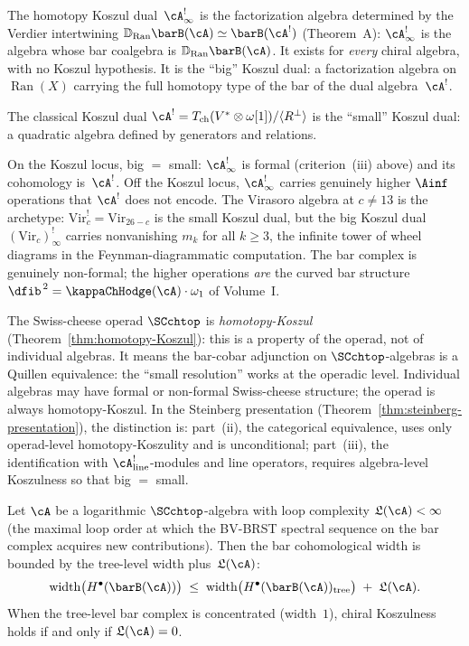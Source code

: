 \begin{remark}
\label{rem:big-vs-small}
The homotopy Koszul dual~$\cA^!_\infty$ is the factorization algebra
determined by the Verdier intertwining
$\mathbb{D}_{\operatorname{Ran}}\barB(\cA) \simeq \barB(\cA^!)$
(Theorem~A): $\cA^!_\infty$ is the algebra whose bar coalgebra is
$\mathbb{D}_{\operatorname{Ran}}\barB(\cA)$.
It exists for \emph{every} chiral algebra, with no Koszul
hypothesis. It is the ``big'' Koszul dual: a factorization algebra on
$\operatorname{Ran}(X)$ carrying the full homotopy type of the bar of
the dual algebra~$\cA^!$.

The classical Koszul dual $\cA^! = T_{\mathrm{ch}}(V^* \otimes
\omega[1])/\langle R^\perp\rangle$ is the ``small'' Koszul dual: a
quadratic algebra defined by generators and relations.

On the Koszul locus, big $=$ small: $\cA^!_\infty$ is formal
(criterion~(iii) above) and its cohomology is~$\cA^!$. Off the
Koszul locus, $\cA^!_\infty$ carries genuinely higher $\Ainf$
operations that $\cA^!$ does not encode. The Virasoro algebra at
$c \neq 13$ is the archetype: $\mathrm{Vir}_c^! = \mathrm{Vir}_{26-c}$
is the small Koszul dual, but the big Koszul dual
$(\mathrm{Vir}_c)^!_\infty$ carries nonvanishing $m_k$ for all
$k \geq 3$, the infinite tower of wheel diagrams in the
Feynman-diagrammatic computation. The bar complex is genuinely
non-formal; the higher operations \emph{are} the curved bar
structure $\dfib^{\,2} = \kappaChHodge(\cA) \cdot \omega_1$ of Volume~I.

The Swiss-cheese operad $\SCchtop$ is \emph{homotopy-Koszul}
(Theorem~\ref{thm:homotopy-Koszul}): this is a property of the
operad, not of individual algebras. It means the bar-cobar
adjunction on $\SCchtop$-algebras is a Quillen equivalence: the
``small resolution'' works at the operadic level. Individual algebras may have formal or non-formal Swiss-cheese
structure; the operad is always homotopy-Koszul.
In the Steinberg presentation
(Theorem~\ref{thm:steinberg-presentation}), the distinction is:
part~(ii), the categorical equivalence, uses only operad-level
homotopy-Koszulity and is unconditional; part~(iii), the
identification with $\cA^!_{\mathrm{line}}$-modules and line operators, requires
algebra-level Koszulness so that big $=$ small.
\end{remark}

\begin{theorem}
\label{thm:width-bound}
Let\/ $\cA$ be a logarithmic $\SCchtop$-algebra with loop
complexity\/ $\mathfrak{L}(\cA) < \infty$
\textup{(}the maximal loop order at which the BV-BRST
spectral sequence on the bar complex acquires new
contributions\textup{)}.
Then the bar cohomological width is bounded by the tree-level
width plus\/~$\mathfrak{L}(\cA)$:
\[
\mathrm{width}\bigl(H^\bullet(\barB(\cA))\bigr)
\;\le\;
\mathrm{width}\bigl(H^\bullet(\barB(\cA))_{\mathrm{tree}}\bigr)
\;+\; \mathfrak{L}(\cA).
\]
When the tree-level bar complex is concentrated
\textup{(}width~$1$\textup{)}, chiral Koszulness holds if
and only if\/ $\mathfrak{L}(\cA) = 0$.
\end{theorem}

